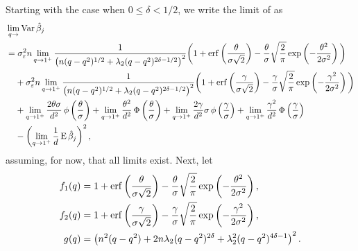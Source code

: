 Starting with the case when \(0 \leq \delta < 1/2\), we write the limit of
 as
\begin{align*}
   & \lim_{q \rightarrow }\var \hat{\beta}_j                                                                                                                                                                                                                                                                                                                                             \\
   & = \sigma_\varepsilon^2 n  \lim_{q \rightarrow 1^+} \frac{1}{\left(n(q-q^2)^{1/2} + \lambda_2(q-q^2)^{2\delta - 1/2}\right)^2}\bigg(1 + \erf\left(\frac{\theta}{\sigma \sqrt{2}}\right) - \frac{\theta}{\sigma}\sqrt{\frac{2}{\pi}} \exp\left(-\frac{\theta^2}{2\sigma^2}\right)\bigg)                                                                                               \\
   & \phantom{= {}} + \sigma_\varepsilon^2 n  \lim_{q \rightarrow 1^+} \frac{1}{\left(n(q-q^2)^{1/2} + \lambda_2(q-q^2)^{2\delta - 1/2}\right)^2}\bigg(1 + \erf\left(\frac{\gamma}{\sigma\sqrt{2}}\right) - \frac{\gamma}{\sigma} \sqrt{\frac{2}{\pi}} \exp\left(- \frac{\gamma^2}{2\sigma^2}\right)\bigg)                                                                               \\
   & \phantom{= {}}+ \lim_{q \rightarrow 1^+} \frac{2\theta\sigma}{d^2} \pdf\left(\frac{\theta}{\sigma}\right) + \lim_{q \rightarrow 1^+} \frac{\theta^2}{d^2} \cdf\left(\frac{\theta}{\sigma}\right) + \lim_{q \rightarrow 1^+} \frac{2\gamma}{d^2} \sigma \pdf\left(\frac{\gamma}{\sigma}\right) + \lim_{q \rightarrow 1^+}\frac{\gamma^2}{d^2} \cdf\left(\frac{\gamma}{\sigma}\right) \\
   & \phantom{= {}}- \left( \lim_{q\rightarrow 1^+}\frac{1}{d}\E \hat{\beta}_j\right)^2,
\end{align*}
assuming, for now, that all limits exist. Next, let
\[
  \begin{aligned}
    f_1(q) & = 1 + \operatorname{erf}\left(\frac{\theta}{\sigma\sqrt{2}}\right) - \frac{\theta}{\sigma}\sqrt{\frac{2}{\pi}} \exp\left(-\frac{\theta^2}{2\sigma^2}\right) , \\
    f_2(q) & = 1 + \operatorname{erf}\left(\frac{\gamma}{\sigma\sqrt{2}}\right) - \frac{\gamma}{\sigma}\sqrt{\frac{2}{\pi}} \exp\left(-\frac{\gamma^2}{2\sigma^2}\right) , \\
    g(q)   & = \left(n^2(q-q^2) + 2n \lambda_2 (q-q^2)^{2\delta} + \lambda_2^2 (q-q^2)^{4\delta - 1}\right)^2.
  \end{aligned}
\]
